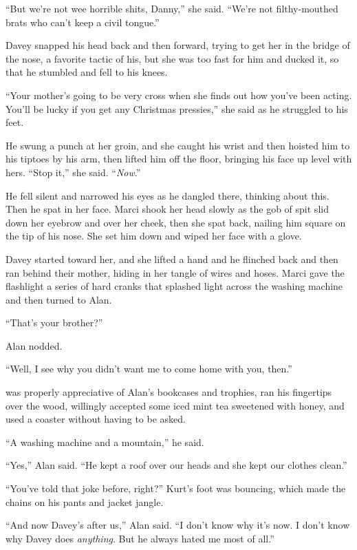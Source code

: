 ``But we're not wee horrible shits, Danny,'' she said.  ``We're not
filthy-mouthed brats who can't keep a civil tongue.''

Davey snapped his head back and then forward, trying to get her in the
bridge of the nose, a favorite tactic of his, but she was too fast for
him and ducked it, so that he stumbled and fell to his knees.

``Your mother's going to be very cross when she finds out how you've
been acting.  You'll be lucky if you get any Christmas pressies,'' she
said as he struggled to his feet.

He swung a punch at her groin, and she caught his wrist and then
hoisted him to his tiptoes by his arm, then lifted him off the floor,
bringing his face up level with hers.  ``Stop it,'' she said. 
``\textit{Now}.''

He fell silent and narrowed his eyes as he dangled there, thinking
about this.  Then he spat in her face.  Marci shook her head slowly as
the gob of spit slid down her eyebrow and over her cheek, then she
spat back, nailing him square on the tip of his nose.  She set him
down and wiped her face with a glove.

Davey started toward her, and she lifted a hand and he flinched back
and then ran behind their mother, hiding in her tangle of wires and
hoses.  Marci gave the flashlight a series of hard cranks that
splashed light across the washing machine and then turned to Alan.

``That's your brother?''

Alan nodded.

``Well, I see why you didn't want me to come home with you, then.''

 was properly appreciative of Alan's bookcases and trophies, ran
his fingertips over the wood, willingly accepted some iced mint tea
sweetened with honey, and used a coaster without having to be asked.

``A washing machine and a mountain,'' he said.

``Yes,'' Alan said.  ``He kept a roof over our heads and she kept our
clothes clean.''

``You've told that joke before, right?'' Kurt's foot was bouncing,
which made the chains on his pants and jacket jangle.

``And now Davey's after us,'' Alan said.  ``I don't know why it's now. 
I don't know why Davey does \textit{anything}.  But he always hated me
most of all.''

